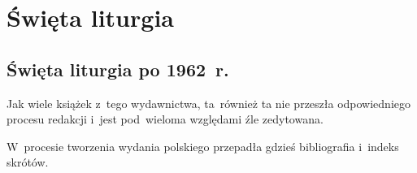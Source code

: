 \documentclass[a4paper,11pt]{article}
\begin{document}
\newpage

\section{Święta liturgia}

\vspace{\spaceTwo}



\subsection{Święta liturgia po 1962~r.}

\vspace{\spaceThree}




\vspace{0em}



\vspace{0em}


\noindent
Jak wiele książek z~tego wydawnictwa, ta~również ta nie przeszła
odpowiedniego procesu redakcji i~jest pod~wieloma względami źle zedytowana.

\vspace{\spaceFour}





\noindent
W~procesie tworzenia wydania polskiego przepadła gdzieś bibliografia
i~indeks skrótów.





\newpage

\end{document}
